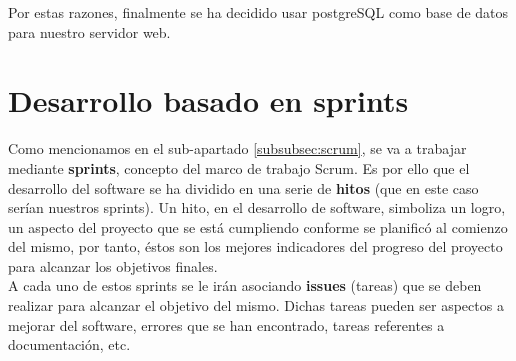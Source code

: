     Por estas razones, finalmente se ha decidido usar postgreSQL como base de datos para
    nuestro servidor web.

\section{Desarrollo basado en sprints} \label{sec:sprints}
Como mencionamos en el sub-apartado \ref{subsubsec:scrum}, se va a trabajar mediante
\textbf{sprints}, concepto del marco de trabajo Scrum. Es por ello que el desarrollo del
software se ha dividido en una serie de \textbf{hitos} (que en este caso serían nuestros
sprints). Un hito, en el desarrollo de software, simboliza un logro, un aspecto del proyecto
que se está cumpliendo conforme se planificó al comienzo del mismo, por tanto, éstos son los
mejores indicadores del progreso del proyecto para alcanzar los objetivos finales.\\

A cada uno de estos sprints se le irán asociando \textbf{issues} (tareas) que se deben realizar
para alcanzar el objetivo del mismo. Dichas tareas pueden ser aspectos a mejorar del software,
errores que se han encontrado, tareas referentes a documentación, etc.\\

